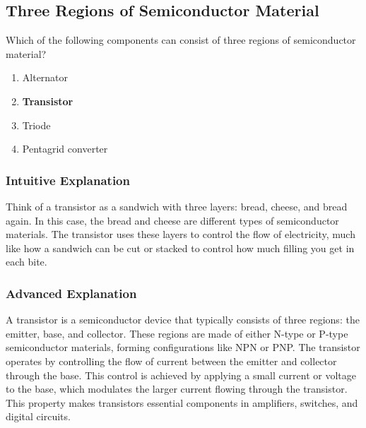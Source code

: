 \subsection{Three Regions of Semiconductor Material}
\label{T6B04}

\begin{tcolorbox}[colback=gray!10!white,colframe=black!75!black,title=T6B04]
Which of the following components can consist of three regions of semiconductor material?
\begin{enumerate}[noitemsep]
    \item Alternator
    \item \textbf{Transistor}
    \item Triode
    \item Pentagrid converter
\end{enumerate}
\end{tcolorbox}

\subsubsection*{Intuitive Explanation}
Think of a transistor as a sandwich with three layers: bread, cheese, and bread again. In this case, the bread and cheese are different types of semiconductor materials. The transistor uses these layers to control the flow of electricity, much like how a sandwich can be cut or stacked to control how much filling you get in each bite.

\subsubsection*{Advanced Explanation}
A transistor is a semiconductor device that typically consists of three regions: the emitter, base, and collector. These regions are made of either N-type or P-type semiconductor materials, forming configurations like NPN or PNP. The transistor operates by controlling the flow of current between the emitter and collector through the base. This control is achieved by applying a small current or voltage to the base, which modulates the larger current flowing through the transistor. This property makes transistors essential components in amplifiers, switches, and digital circuits.